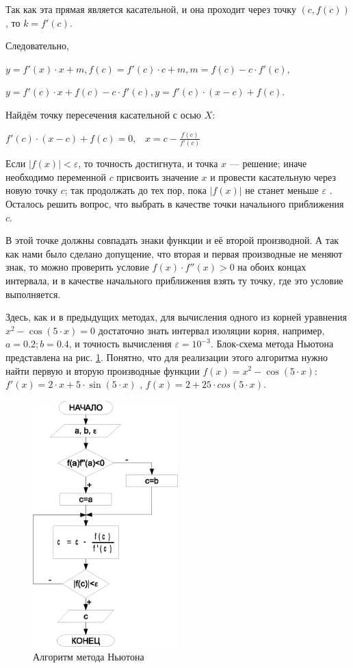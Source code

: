 Так как эта прямая является касательной, и она проходит через точку  $(c,f(c))$, то  $k=f'(c)$. 

Следовательно, 

$y=f'(x)\cdot x+m,f(c)=f'(c)\cdot c+m,m=f(c)-c\cdot f'(c),$

 $y=f'(c)\cdot x+f(c)-c\cdot f'(c),y=f'(c)\cdot (x-c)+f(c)$.

Найдём точку пересечения касательной с осью $X$:

 $f'(c)\cdot (x-c)+f(c)=0$,\ \ ${x=c-\frac{f(c)}{f'(c)}}$  

Если  $|f(x)|<\varepsilon$, то точность достигнута, и точка $x$ --- решение; иначе необходимо переменной
$c$ присвоить значение $x$ и провести касательную через новую точку
$c$; так продолжать до тех пор, пока  $|f(x)|$  не станет меньше  $\varepsilon$ . Осталось решить
вопрос, что выбрать в качестве точки начального приближения $c$.

В этой точке должны совпадать знаки функции и её второй производной. А так как нами было сделано допущение, что вторая и
первая производные не меняют знак, то можно проверить условие  $f(x)\cdot f''(x)>0$ на обоих 
концах интервала, и в качестве начального приближения взять ту точку, где это условие
выполняется.

Здесь, как и в предыдущих методах, для вычисления одного из корней уравнения  $x^2-\cos (5\cdot x)=0$  достаточно
знать интервал изоляции корня, например,  $a=0.2;b=0.4$,  и точность вычисления  $\varepsilon=10^{-3}$. Блок-схема
метода Ньютона представлена на рис. \ref{ch04:refDrawing7}. Понятно, что для реализации этого алгоритма нужно найти первую и
вторую производные функции  $f(x)=x^2-\cos (5\cdot x)$:  $f'(x)=2\cdot x+5\cdot \sin (5\cdot x)$ , 
$f(x) =2 +25 \cdot cos(5 \cdot x)$.

\begin{figure}[htb]
\begin{center}
\includegraphics[width=0.5\textwidth]{img/ris_4_8}
\caption{Алгоритм метода Ньютона}
\label{ch04:refDrawing7}
\end{center}
\end{figure}

